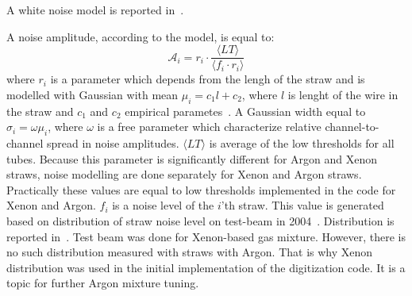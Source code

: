
A white noise model is reported in~\cite{kittelmann_thesis}.


A noise amplitude, according to the model, is equal to:
\begin{equation}
 \mathcal A_{i} = r_{i} \cdot \dfrac{\langle LT \rangle}{\langle f_i \cdot r_i \rangle}
\end{equation}
where $r_{i}$ is a parameter which depends from the lengh of the straw and is modelled with Gaussian with mean $\mu_i = c_1 l + c_2$, where $l$ is lenght of the wire in the straw
and $c_1$ and $c_2$ empirical parametes~\cite{kittelmann_thesis}. A Gaussian width equal to $\sigma_i = \omega \mu_i$, where $\omega$ is a free parameter which characterize
relative channel-to-channel spread in noise amplitudes.
$\langle LT \rangle$ is average of the low thresholds for all tubes. Because this parameter is significantly different for Argon and Xenon straws, noise modelling are done separately
for Xenon and Argon straws. Practically these values are equal to low thresholds implemented in the code for Xenon and Argon.
$f_{i}$ is a noise level of the $i$'th straw. This value is generated based on distribution of straw noise level on test-beam in 2004~\cite{trt_test_beam}. 
Distribution is reported in~\cite{kittelmann_thesis}. Test beam was done for Xenon-based gas mixture. 
However, there is no such distribution measured with straws with Argon. That is why Xenon distribution was used in the initial implementation of the digitization code.
It is a topic for further Argon mixture tuning.





